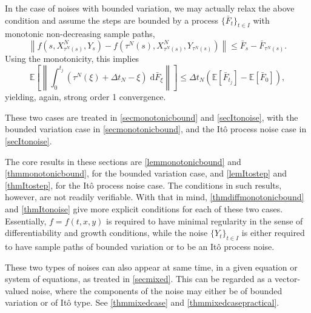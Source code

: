 \documentclass[reqno,12pt]{amsart}
\theoremstyle{plain} %
\theoremstyle{definition} %
\begin{document}
In the case of noises with bounded variation, we may actually relax the above condition and assume the steps are bounded by a process $\{\bar F_t\}_{t\in I}$ with monotonic non-decreasing sample paths,
\[
    \left\|f(s, X_{\tau^N(s)}^N, Y_s) - f(\tau^N(s), X_{\tau^N(s)}^N, Y_{\tau^N(s)})\right\| \leq \bar F_s - \bar F_{\tau^N(s)}.
\]
Using the monotonicity, this implies
\[
    \mathbb{E}\left[\left\| \int_0^{t_j} (\tau^N(\xi) + \Delta t_N - \xi) \;\mathrm{d} \bar F_\xi \right\|\right] \leq \Delta t_N \left(\mathbb{E}[\bar F_{t_j}] - \mathbb{E}[\bar F_0]\right),
\]
yielding, again, strong order 1 convergence.

These two cases are treated in \cref{secmonotonicbound} and \cref{secItonoise}, with the bounded variation case in \cref{secmonotonicbound}, and the It\^o process noise case in \cref{secItonoise}.

The core results in these sections are \cref{lemmonotonicbound} and \cref{thmmonotonicbound}, for the bounded variation case, and \cref{lemItostep} and \cref{thmItostep}, for the It\^o process noise case. The conditions in such results, however, are not readily verifiable. With that in mind, \cref{thmdiffmonotonicbound} and \cref{thmItonoise} give more explicit conditions for each of these two cases. Essentially, $f=f(t, x, y)$ is required to have minimal regularity in the sense of differentiability and growth conditions, while the noise $\{Y_t\}_{t\in I}$ is either required to have sample paths of bounded variation or to be an It\^o process noise.

These two types of noises can also appear at same time, in a given equation or system of equations, as treated in \cref{secmixed}. This can be regarded as a vector-valued noise, where the components of the noise may either be of bounded variation or of It\^o type. See \cref{thmmixedcase} and \cref{thmmixedcasepractical}.
\end{document}
